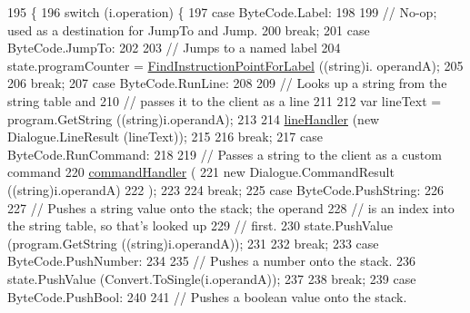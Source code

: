 \begin{DoxyCode}
195                                                     \{
196             \textcolor{keywordflow}{switch} (i.operation) \{
197             \textcolor{keywordflow}{case} ByteCode.Label:
198 
199                 \textcolor{comment}{// No-op; used as a destination for JumpTo and Jump.}
200                 \textcolor{keywordflow}{break};
201             \textcolor{keywordflow}{case} ByteCode.JumpTo:
202 
203                 \textcolor{comment}{// Jumps to a named label}
204                 state.programCounter = \hyperlink{a00072_af613c8b2d098678b6ea05b509c0a0cb6}{FindInstructionPointForLabel} ((\textcolor{keywordtype}{string})i.
      operandA);
205 
206                 \textcolor{keywordflow}{break};
207             \textcolor{keywordflow}{case} ByteCode.RunLine:
208 
209                 \textcolor{comment}{// Looks up a string from the string table and}
210                 \textcolor{comment}{// passes it to the client as a line}
211 
212                 var lineText = program.GetString ((string)i.operandA);
213 
214                 \hyperlink{a00072_a29b30454f068fc7e107d48bff4346fd9}{lineHandler} (\textcolor{keyword}{new} Dialogue.LineResult (lineText));
215 
216                 \textcolor{keywordflow}{break};
217             \textcolor{keywordflow}{case} ByteCode.RunCommand:
218 
219                 \textcolor{comment}{// Passes a string to the client as a custom command}
220                 \hyperlink{a00072_ab89b02227b92c74552f719afd47848e4}{commandHandler} (
221                     \textcolor{keyword}{new} Dialogue.CommandResult ((\textcolor{keywordtype}{string})i.operandA)
222                 );
223 
224                 \textcolor{keywordflow}{break};
225             \textcolor{keywordflow}{case} ByteCode.PushString:
226 
227                 \textcolor{comment}{// Pushes a string value onto the stack; the operand}
228                 \textcolor{comment}{// is an index into the string table, so that's looked up}
229                 \textcolor{comment}{// first.}
230                 state.PushValue (program.GetString ((string)i.operandA));
231 
232                 \textcolor{keywordflow}{break};
233             \textcolor{keywordflow}{case} ByteCode.PushNumber:
234 
235                 \textcolor{comment}{// Pushes a number onto the stack.}
236                 state.PushValue (Convert.ToSingle(i.operandA));
237 
238                 \textcolor{keywordflow}{break};
239             \textcolor{keywordflow}{case} ByteCode.PushBool:
240 
241                 \textcolor{comment}{// Pushes a boolean value onto the stack.}

\end{DoxyCode}
